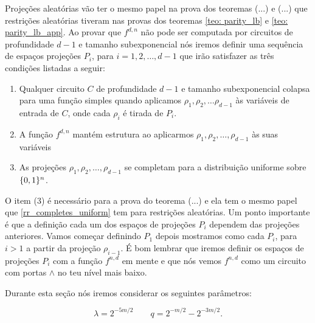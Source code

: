Projeções aleatórias vão ter o mesmo papel na prova dos teoremas (...) e (...) que restrições aleatórias tiveram nas provas dos teoremas \ref{teo: parity_lb} e \ref{teo: parity_lb_app}. Ao provar que $f^{d, n}$ não pode ser computada por circuitos de profundidade $d - 1$ e tamanho subexponencial nós iremos definir uma sequência de espaços projeções $P_{i}$, para $i = 1, 2, \dots, d - 1$ que irão satisfazer as três condições listadas a seguir:

\begin{enumerate}

	\item Qualquer circuito $C$ de profundidade $d - 1$ e tamanho subexponencial colapsa para uma função simples quando aplicamos $\rho_{1}, \rho_{2}, \dots \rho_{d - 1}$ às variáveis de entrada de $C$, onde cada $\rho_{i}$ é tirada de $P_{i}$.
	
	\item A função $f^{d, n}$ mantém estrutura ao aplicarmos $\rho_{1}, \rho_{2}, \dots, \rho_{d - 1}$ às suas variáveis
	\item As projeções $\rho_{1}, \rho_{2}, \dots, \rho_{d - 1}$ se completam para a distribuição uniforme sobre $\{0, 1\}^{n}$.

\end{enumerate}
O item (3) é necessário para a prova do teorema (...) e ela tem o mesmo papel que \ref{rr_completes_uniform} tem para restrições aleatórias. Um ponto importante é que a definição cada um dos espaços de projeções $P_{i}$ dependem das projeções anteriores. Vamos começar definindo $P_{1}$ depois mostramos como cada $P_{i}$, para $i > 1$ a partir da projeção $\rho_{i - 1}$. É bom lembrar que iremos definir os espaços de projeções $P_{i}$ com a função $f^{n, d}$ em mente e que nós vemos $f^{n, d}$ como um circuito com portas $\land$ no teu nível mais baixo.

Durante esta seção nós iremos considerar os seguintes parâmetros:

\begin{equation} \label{lambda_q_defi}
	\lambda = 2^{-5m/2} \qquad q = 2^{-m/2} - 2^{-3m/2}.
\end{equation}


